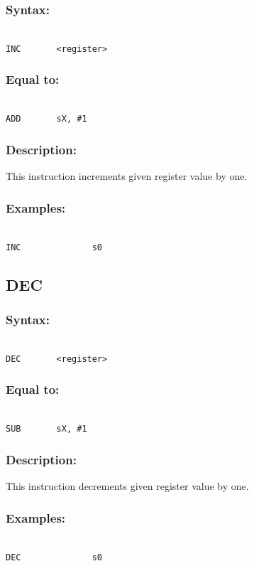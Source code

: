         \subsubsection{Syntax:}
        {
            ~\\
            \usecodefont
            \verb'INC       <register>'
        }
        \subsubsection{Equal to:}
        {
            ~\\
            \usecodefont
            \verb'ADD       sX, #1'
        }
        \subsubsection{Description:}
    This instruction increments given register value by one.
        \subsubsection{Examples:}
        {
            ~\\
            \usecodefont
            \verb'INC              s0'\\
        }

    \subsection{DEC}
        \subsubsection{Syntax:}
        {
            ~\\
            \usecodefont
            \verb'DEC       <register>'
        }
        \subsubsection{Equal to:}
        {
            ~\\
            \usecodefont
            \verb'SUB       sX, #1'
        }
        \subsubsection{Description:}
    This instruction decrements given register value by one.
        \subsubsection{Examples:}
        {
            ~\\
            \usecodefont
            \verb'DEC              s0'\\
        }

